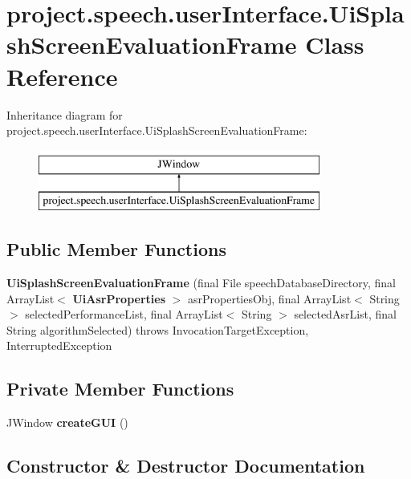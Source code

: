 \section{project.\+speech.\+user\+Interface.\+Ui\+Splash\+Screen\+Evaluation\+Frame Class Reference}
\label{classproject_1_1speech_1_1user_interface_1_1_ui_splash_screen_evaluation_frame}
Inheritance diagram for project.\+speech.\+user\+Interface.\+Ui\+Splash\+Screen\+Evaluation\+Frame\+:\begin{figure}[H]
\begin{center}
\leavevmode
\includegraphics[height=2.000000cm]{classproject_1_1speech_1_1user_interface_1_1_ui_splash_screen_evaluation_frame}
\end{center}
\end{figure}
\subsection*{Public Member Functions}
\begin{DoxyCompactItemize}
\item 
{\bf Ui\+Splash\+Screen\+Evaluation\+Frame} (final File speech\+Database\+Directory, final Array\+List$<$ {\bf Ui\+Asr\+Properties} $>$ asr\+Properties\+Obj, final Array\+List$<$ String $>$ selected\+Performance\+List, final Array\+List$<$ String $>$ selected\+Asr\+List, final String algorithm\+Selected)  throws Invocation\+Target\+Exception, Interrupted\+Exception  
\end{DoxyCompactItemize}
\subsection*{Private Member Functions}
\begin{DoxyCompactItemize}
\item 
J\+Window {\bf create\+G\+U\+I} ()
\end{DoxyCompactItemize}


\subsection{Constructor \& Destructor Documentation}
